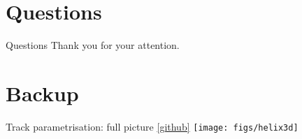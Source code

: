 \section*{Questions}
\begin{frame}{Questions}
\centering
\Large Thank you for your attention.
\end{frame}
\section*{Backup} %
\begin{frame}[noframenumbering]{Track parametrisation: full picture \hspace{1cm}
\href{https://arxiv.org/abs/1901.11198}{\color{blue!40!gray}{\small [1901.11198],}
\href{https://github.com/ndawe/tikz-track} {\small [github]}}
}
\centering
\texttt{[image: figs/helix3d]}
\end{frame}
